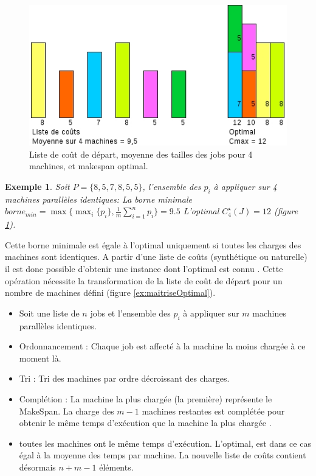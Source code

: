 \documentclass[a4paper,12pt]{report}
\theoremstyle{plain}				%
\newtheorem{example}{Exemple}
\theoremstyle{definition}				%
\begin{document}
\bigskip

\begin{figure}
{\centering
\includegraphics[width=\columnwidth]{MoyenneVsOptimal.jpg}
\caption{Liste de coût de départ, moyenne des tailles des jobs pour 4 machines, et makespan optimal.}
\label{ex:borneMinVSOptimalListeDepart}
\par}
\end{figure}

\begin{example}
Soit $P=\{8, 5, 7, 8, 5, 5\}$, l'ensemble des $p_i$ à appliquer sur 4 machines parallèles identiques:
La borne minimale $borne_{min} = \max \{ \max_i\{p_i\}, \frac{1}{m} \sum_{i=1}^{n} p_i \} = 9.5$ 
L'optimal $C_4^\star(J) = 12$ (figure \ref{ex:borneMinVSOptimalListeDepart}).
\end{example}

Cette borne minimale est égale à l'optimal uniquement si toutes les charges des machines sont identiques.
A partir d'une liste de coûts (synthétique ou naturelle) il est donc possible d'obtenir une instance dont l'optimal est connu \cite{benoit2021update}. Cette opération nécessite la transformation de la liste de coût de départ pour un 
  nombre de machines défini (figure \ref{ex:maitriseOptimal}).
\begin{itemize}
	\item Soit une liste de $n$ jobs et l'ensemble des $p_i$ à appliquer sur $m$ machines parallèles identiques.
	\item Ordonnancement : Chaque job est affecté à la machine la moins chargée à ce moment là. 
	\item Tri : Tri des machines par ordre décroissant des charges.
	\item Complétion : La machine la plus chargée (la première) représente le MakeSpan. 
	      La charge des $m-1$ machines restantes est complétée pour obtenir le même temps d'exécution que la machine la plus 	          chargée .
	\item toutes les machines ont le même temps d'exécution. L'optimal, est dans ce cas égal à la 
	      moyenne des temps par machine. 
	      La nouvelle liste de coûts contient désormais $n + m-1$ éléments.
\end{itemize}
\end{document}
